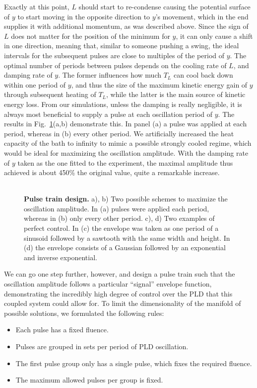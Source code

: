 Exactly at this point, $L$ should start to re-condense causing the potential surface of $y$ to start moving in the opposite direction to $y$'s movement, which in the end supplies it with additional momentum, as was described above.
Since the sign of $L$ does not matter for the position of the minimum for $y$, it can only cause a shift in one direction, meaning that, similar to someone pushing a swing, the ideal intervals for the subsequent pulses are close to multiples of the period of $y$.
The optimal number of periods between pulses depends on the cooling rate of $L$, and damping rate of $y$.
The former influences how much $T_L$ can cool back down within one period of $y$, and thus the size of the maximum kinetic energy gain of $y$ through subsequent heating of $T_L$, while the latter is the main source of kinetic energy loss.
From our simulations, unless the damping is really negligible, it is always most beneficial to supply a pulse at each oscillation period of $y$.
The results in Fig.~\ref{fig:Cr_control}(a,b) demonstrate this. In panel (a) a pulse was applied at each  period, whereas in (b) every other period. 
We artificially increased the heat capacity of the bath to infinity to mimic a possible strongly cooled regime, which would be ideal for maximizing the oscillation amplitude.
With the damping rate of $y$ taken as the one fitted to the experiment, the maximal amplitude thus achieved is about 450\% the original value, quite a remarkable increase.  
\\\\
\begin{figure}
	\caption{\label{fig:Cr_control} {\bf Pulse train design.} a), b) Two possible schemes to maximize the oscillation amplitude. In (a) pulses were applied each period, whereas in (b) only every other period. c), d) Two examples of perfect control. In (c) the envelope was taken as one period of a sinusoid followed by a sawtooth with the same width and height. In (d) the envelope consists of a Gaussian followed by an exponential and inverse exponential.}
\end{figure}
We can go one step further, however, and design a pulse train such that the oscillation amplitude follows a particular ``signal'' envelope function, demonstrating the incredibly high degree of control over the PLD that this coupled system could allow for.  
To limit the dimensionality of the manifold of possible solutions, we formulated the following rules:
\begin{itemize}
	\item Each pulse has a fixed fluence.
	\item Pulses are grouped in sets per period of PLD oscillation.
	\item The first pulse group only has a single pulse, which fixes the required fluence.
	\item The maximum allowed pulses per group is fixed.
\end{itemize}
